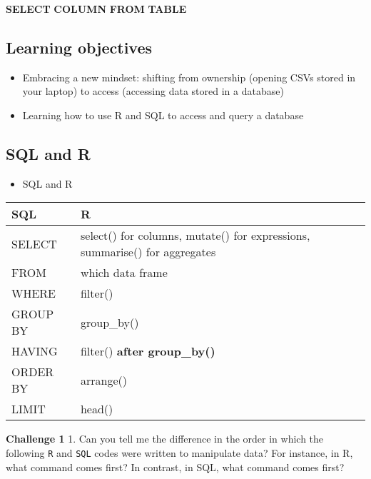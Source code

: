 \documentclass[
]{book}
\newenvironment{Shaded}{\begin{snugshade}}{\end{snugshade}}
\newcommand{\KeywordTok}[1]{\textcolor[rgb]{0.13,0.29,0.53}{\textbf{#1}}}
\providecommand{\tightlist}{%
  \setlength{\itemsep}{0pt}\setlength{\parskip}{0pt}}
\begin{document}
\begin{Shaded}
\begin{Highlighting}[]
\KeywordTok{SELECT} \KeywordTok{COLUMN} \KeywordTok{FROM} \KeywordTok{TABLE} 
\end{Highlighting}
\end{Shaded}

\hypertarget{learning-objectives}{%
\subsection{Learning objectives}\label{learning-objectives}}

\begin{itemize}
\item
  Embracing a new mindset: shifting from ownership (opening CSVs stored in your laptop) to access (accessing data stored in a database)
\item
  Learning how to use R and SQL to access and query a database
\end{itemize}

\hypertarget{sql-and-r}{%
\subsection{SQL and R}\label{sql-and-r}}

\begin{itemize}
\tightlist
\item
  SQL and R
\end{itemize}

\begin{longtable}[]{@{}
  >{\raggedright\arraybackslash}p{}
  >{\raggedright\arraybackslash}p{}@{}}
\toprule
SQL & R \\
\midrule
\endhead
SELECT & select() for columns, mutate() for expressions, summarise() for aggregates \\
FROM & which data frame \\
WHERE & filter() \\
GROUP BY & group\_by() \\
HAVING & filter() \textbf{after group\_by()} \\
ORDER BY & arrange() \\
LIMIT & head() \\
\bottomrule
\end{longtable}

\textbf{Challenge 1}
1. Can you tell me the difference in the order in which the following \texttt{R} and \texttt{SQL} codes were written to manipulate data? For instance, in R, what command comes first? In contrast, in SQL, what command comes first?
\end{document}
